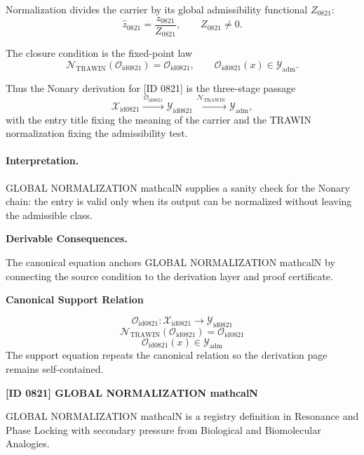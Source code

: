 Normalization divides the carrier by its global admissibility functional $Z_{0821}$:\[
\widehat{z}_{0821}=\frac{z_{0821}}{Z_{0821}},\qquad Z_{0821}\neq 0.
\]

The closure condition is the fixed-point law\[
\mathcal{N}_{\mathrm{TRAWIN}}(\mathcal{O}_{\mathrm{id0821}})=\mathcal{O}_{\mathrm{id0821}},\qquad \mathcal{O}_{\mathrm{id0821}}(x)\in\mathcal{Y}_{\mathrm{adm}}.
\]

Thus the Nonary derivation for [ID 0821] is the three-stage passage
\[
\mathcal{X}_{\mathrm{id0821}}\xrightarrow{\,\mathcal{O}_{\mathrm{id0821}}\,} \mathcal{Y}_{\mathrm{id0821}}\xrightarrow{\,\mathcal{N}_{\mathrm{TRAWIN}}\,} \mathcal{Y}_{\mathrm{adm}},
\]
with the entry title fixing the meaning of the carrier and the TRAWIN normalization fixing the admissibility test.

\paragraph{Interpretation.} GLOBAL NORMALIZATION mathcalN supplies a sanity check for the Nonary chain: the entry is valid only when its output can be normalized without leaving the admissible class.

\par\vspace{0.35em}
\noindent\textbf{Derivable Consequences.}\quad
\begingroup
\footnotesize
\raggedright
The canonical equation anchors GLOBAL NORMALIZATION mathcalN by connecting the source condition to the derivation layer and proof certificate.
\par\endgroup

\noindent\textbf{Canonical Support Relation}\par
\[
\mathcal{O}_{\mathrm{id0821}}:\mathcal{X}_{\mathrm{id0821}}\longrightarrow\mathcal{Y}_{\mathrm{id0821}}
\]
\[
\mathcal{N}_{\mathrm{TRAWIN}}(\mathcal{O}_{\mathrm{id0821}})=\mathcal{O}_{\mathrm{id0821}}
\]
\[
\mathcal{O}_{\mathrm{id0821}}(x)\in\mathcal{Y}_{\mathrm{adm}}
\]
\noindent The support equation repeats the canonical relation so the derivation page remains self-contained.\par

\clearpage
\noindent\textbf{[ID 0821] GLOBAL NORMALIZATION mathcalN}\par
\vspace{0.35em}
\begingroup\small
{}
GLOBAL NORMALIZATION mathcalN is a registry definition in Resonance and Phase Locking with secondary pressure from Biological and Biomolecular Analogies.

